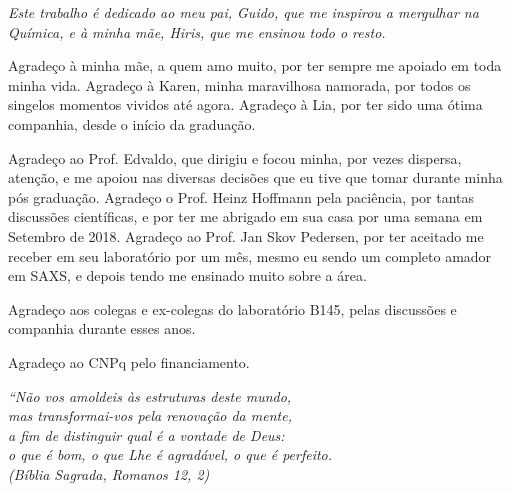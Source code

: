 \documentclass[
	12pt,				%
	openright,			%
	twoside,			%
	a4paper,			%
	english,			%
	brazil%
	]{abntex2}
\begin{document}
\begin{dedicatoria}
   \vspace*{\fill}
   \centering
   \noindent
   \textit{
   	Este trabalho é dedicado ao meu pai, Guido, que me inspirou a mergulhar na Química, e à minha mãe, Hiris, que me ensinou todo o resto.   
} \vspace*{\fill}
\end{dedicatoria}

\begin{agradecimentos}

Agradeço à minha mãe, a quem amo muito, por ter sempre me apoiado em toda minha vida. Agradeço à Karen, minha maravilhosa namorada, por todos os singelos momentos vividos até agora. Agradeço à Lia, por ter sido uma ótima companhia, desde o início da graduação.

Agradeço ao Prof. Edvaldo, que dirigiu e focou minha, por vezes dispersa, atenção, e me apoiou nas diversas decisões que eu tive que tomar durante minha pós graduação. Agradeço o Prof. Heinz Hoffmann pela paciência, por tantas discussões científicas, e por ter me abrigado em sua casa por uma semana em Setembro de 2018. Agradeço ao Prof. Jan Skov Pedersen, por ter aceitado me receber em seu laboratório por um mês, mesmo eu sendo um completo amador em SAXS, e depois tendo me ensinado muito sobre a área.

Agradeço aos colegas e ex-colegas do laboratório B145, pelas discussões e companhia durante esses anos.

Agradeço ao CNPq pelo financiamento.

\end{agradecimentos}

\begin{epigrafe}
    \vspace*{\fill}
	\begin{flushright}
		\textit{``Não vos amoldeis às estruturas deste mundo, \\
		mas transformai-vos pela renovação da mente, \\
		a fim de distinguir qual é a vontade de Deus: \\
		o que é bom, o que Lhe é agradável, o que é perfeito.\\
		(Bíblia Sagrada, Romanos 12, 2)}
	\end{flushright}
\end{epigrafe}
\end{document}
